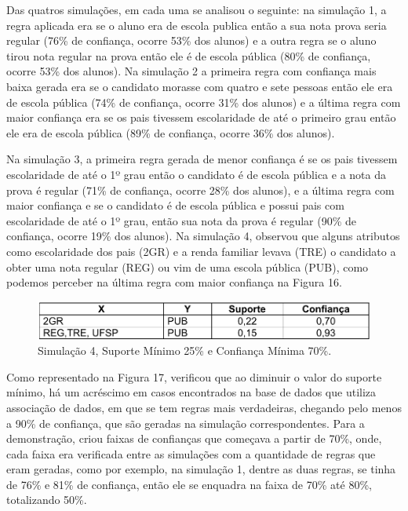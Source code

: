 \par
Das quatros simulações, em cada uma se analisou o seguinte: na simulação 1, a regra aplicada era se o aluno era de escola publica então a sua nota prova seria regular (76\% de confiança, ocorre 53\% dos alunos) e a outra regra se o aluno tirou nota regular na prova então ele é de escola pública (80\% de confiança, ocorre 53\% dos alunos). Na simulação 2 a primeira regra com confiança mais baixa gerada era se o candidato morasse com quatro e sete pessoas então ele era de escola pública (74\% de confiança, ocorre 31\% dos alunos) e a última regra com maior confiança era se os pais tivessem escolaridade de até o primeiro grau então ele era de escola pública (89\% de confiança, ocorre 36\% dos alunos).

\par
Na simulação 3, a primeira regra gerada de menor confiança é se os pais tivessem escolaridade de até o 1º grau então o candidato é de escola pública e a nota da prova é regular (71\% de confiança, ocorre 28\% dos alunos), e a última regra com maior confiança e se o candidato é de escola pública e possui pais com escolaridade de até o 1º grau, então sua nota da prova é regular (90\% de confiança, ocorre 19\% dos alunos). Na simulação 4,  observou que alguns atributos como escolaridade dos pais (2GR) e a renda familiar levava (TRE) o candidato a obter uma nota regular (REG) ou vim de uma escola pública (PUB), como podemos perceber na última regra com maior confiança na Figura 16.


\begin{figure}[!htp]
	\begin{center}
    \caption{\label{fig:waveform_fig} Simulação 4, Suporte Mínimo 25\% e Confiança Mínima 70\%.}
	\includegraphics[scale=0.49]{Figuras/Simulacao_quatro.png}
	\end{center}
\end{figure}

\par
Como representado na Figura 17,  verificou que ao diminuir o valor do suporte mínimo, há um acréscimo em casos encontrados na base de dados que utiliza associação de dados, em que se tem regras mais verdadeiras, chegando pelo menos a 90\% de confiança, que são geradas na simulação correspondentes. Para a demonstração,  criou faixas de confianças que começava a partir de 70\%, onde, cada faixa era verificada entre as simulações com a quantidade de regras que eram geradas, como por exemplo, na simulação 1, dentre as duas regras, se tinha de 76\% e 81\% de confiança, então ele se enquadra na faixa de 70\% até 80\%, totalizando 50\%.

